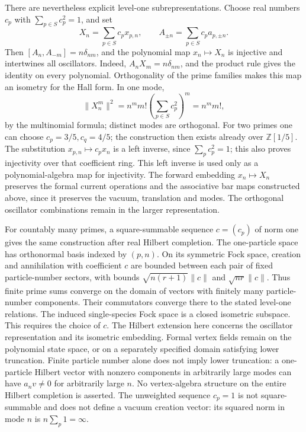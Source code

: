 There are nevertheless explicit level-one subrepresentations.
Choose real numbers $c_p$ with $\sum_{p\in S}c_p^2=1$, and set
\[
 X_n=\sum_{p\in S}c_px_{p,n},\qquad
 A_{\pm n}=\sum_{p\in S}c_pa_{p,\pm n}.
\]
Then $[A_n,A_{-m}]=n\delta_{nm}$, and the polynomial map
$x_n\mapsto X_n$ is injective and intertwines all oscillators.
Indeed, $A_nX_m=n\delta_{nm}$, and the product rule gives the
identity on every polynomial. Orthogonality of the prime families
makes this map an isometry for the Hall form. In one mode,
\[
 \|X_n^m\|^2=n^m m!\left(\sum_{p\in S}c_p^2\right)^m=n^m m!,
\]
by the multinomial formula; distinct modes are orthogonal.
For two primes one can choose $c_p=3/5,c_q=4/5$; the construction
then exists already over $\mathbb Z[1/5]$.
The substitution $x_{p,n}\mapsto c_px_n$ is a left inverse, since
$\sum_pc_p^2=1$; this also proves injectivity over that coefficient ring.
This left inverse is used only as a polynomial-algebra map for injectivity.
The forward embedding $x_n\mapsto X_n$ preserves the formal current
operations and the associative bar maps constructed above, since it
preserves the vacuum, translation and modes.
The orthogonal oscillator combinations remain in the larger representation.

For countably many primes, a square-summable sequence $c=(c_p)$ of norm
one gives the same construction after real Hilbert completion.
The one-particle space has orthonormal basis indexed by $(p,n)$.
On its symmetric Fock space, creation and annihilation with coefficient
$c$ are bounded between each pair of fixed particle-number sectors,
with bounds $\sqrt{n(r+1)}\|c\|$ and $\sqrt{nr}\|c\|$.
Thus finite prime sums converge on the domain of vectors with finitely
many particle-number components. Their commutators converge there to
the stated level-one relations. The induced single-species Fock space
is a closed isometric subspace. This requires the choice of $c$.
The Hilbert extension here concerns the oscillator representation and
its isometric embedding. Formal vertex fields remain on the polynomial
state space, or on a separately specified domain satisfying lower
truncation. Finite particle number alone does not imply lower truncation:
a one-particle Hilbert vector with nonzero components in arbitrarily
large modes can have $a_nv\ne0$ for arbitrarily large $n$. No
vertex-algebra structure on the entire Hilbert completion is asserted.
The unweighted sequence $c_p=1$ is not square-summable and does not
define a vacuum creation vector: its squared norm in mode $n$ is
$n\sum_p1=\infty$.

